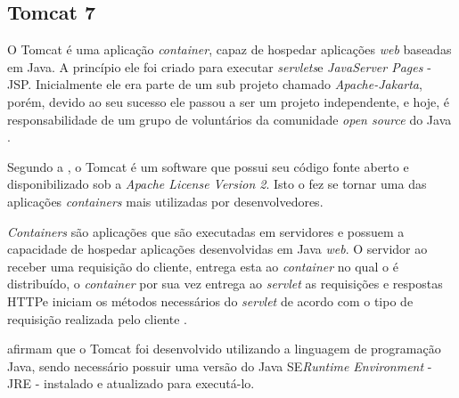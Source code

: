 \subsection{Tomcat 7}

\par O Tomcat é uma aplicação \textit{container}, capaz de hospedar aplicações \textit{web} baseadas em Java. A princípio ele foi criado para executar \textit{servlets}\footnotemark[15] e \textit{JavaServer Pages} - JSP\footnotemark[16]. Inicialmente ele era parte de um sub projeto chamado \textit{Apache-Jakarta}, porém, devido ao seu sucesso ele passou a ser um projeto independente, e hoje, é responsabilidade de um grupo de voluntários da comunidade \textit{open source} do Java \cite{vukotic_goodwill_apache_tomcat_7}.



\par Segundo a , o Tomcat é um software que possui seu código fonte aberto e disponibilizado sob a \textit{Apache License Version 2}. Isto o fez se tornar uma das aplicações \textit{containers} mais utilizadas por desenvolvedores.

\par \textit{Containers} são aplicações que são executadas em servidores e possuem a capacidade de hospedar aplicações desenvolvidas em Java \textit{web}. O servidor ao receber uma requisição do cliente, entrega esta ao \textit{container} no qual o \textit{} é distribuído, o \textit{container} por sua vez entrega ao \textit{servlet} as requisições e respostas HTTP\footnotemark[17] e iniciam os métodos necessários do \textit{servlet} de acordo com o tipo de requisição realizada pelo cliente \cite{basham_sierra_bates_use_cabeca_servlets_jsp}.


\par {} afirmam que o Tomcat foi desenvolvido utilizando a linguagem de programação Java, sendo necessário possuir uma versão do Java SE\footnotemark[18]  \textit{Runtime Environment} - JRE - instalado e atualizado para executá-lo.

